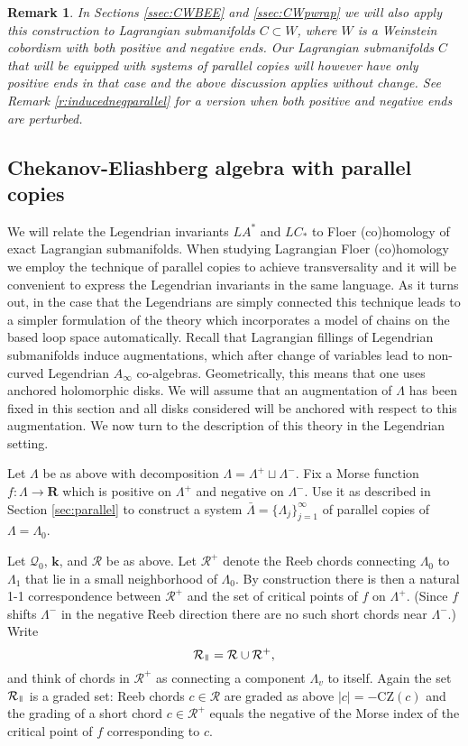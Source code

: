 \documentclass{gtpart}
\newtheorem{rem}[thm]{Remark}
\renewcommand{\k}{\mathbf{k}}
\renewcommand{\R}{\mathbf{R}}
\renewcommand{\parallel}{{\mkern3mu\vphantom{\perp}\vrule depth 0pt\mkern2mu\vrule depth
0pt\mkern3mu}}
\begin{document}
\begin{rem}
	In Sections \ref{ssec:CWBEE} and \ref{ssec:CWpwrap} we will also apply this construction to Lagrangian submanifolds $C\subset W$, where $W$ is a Weinstein cobordism with both positive and negative ends. Our Lagrangian submanifolds $C$ that will be equipped with systems of parallel copies will however have only positive ends in that case and the above discussion applies without change. See Remark \ref{r:inducednegparallel} for a version when both positive and negative ends are perturbed. 
\end{rem}



\subsection{Chekanov-Eliashberg algebra with parallel copies}\label{ssec:parallelcopies}
We will relate the Legendrian invariants $LA^{\ast}$ and $LC_{\ast}$ to Floer (co)homology of exact
Lagrangian submanifolds. When studying Lagrangian Floer (co)homology we employ the technique of
parallel copies to achieve transversality and it will be convenient to express the Legendrian
invariants in the same language. As it turns out, in the case that the Legendrians are simply
connected this technique leads to a simpler formulation of the theory which incorporates a model of
chains on the based loop space automatically. Recall that Lagrangian fillings of Legendrian
submanifolds induce augmentations, which after change of variables lead to non-curved Legendrian
$A_\infty$ co-algebras. Geometrically, this means that one uses anchored holomorphic disks. We will
assume that an augmentation of $\Lambda$ has been fixed in this section and all disks considered
will be anchored with respect to this augmentation. We now turn to the description of this theory in
the Legendrian setting. 
   
Let $\Lambda$ be as above with decomposition $\Lambda=\Lambda^{+}\sqcup\Lambda^{-}$. Fix a Morse
function $f\colon\Lambda\to\R$ which is positive on $\Lambda^{+}$ and negative on $\Lambda^{-}$. Use
it as described in Section \ref{sec:parallel} to construct a system $\bar\Lambda=\{\Lambda_{j}\}_{j=1}^{\infty}$ of parallel copies of $\Lambda=\Lambda_{0}$.    

Let $\mathcal{Q}_{0}$, $\k$, and $\mathcal{R}$ be as above. Let $\mathcal{R}^{+}$ denote the Reeb
chords connecting $\Lambda_{0}$ to $\Lambda_{1}$ that lie in a small neighborhood of $\Lambda_{0}$.
By construction there is then a natural 1-1 correspondence between $\mathcal{R}^{+}$ and the set of
critical points of $f$ on $\Lambda^{+}$. (Since $f$ shifts $\Lambda^{-}$ in the negative Reeb
direction there are no such short chords near $\Lambda^{-}$.) Write
\[ \mathcal{R}_{\parallel}=\mathcal{R}\cup\mathcal{R}^{+}, \]
and think of chords in $\mathcal{R}^{+}$ as connecting a component $\Lambda_{v}$ to itself.
Again the set $\mathcal{R}_{\parallel}$ is a graded set: Reeb chords $c\in \mathcal{R}$ are graded as above $|c|=-\mathrm{CZ}(c)$ and the grading of a short chord $c \in \mathcal{R}^{+}$ equals the negative of the Morse index of the critical point of $f$ corresponding to $c$.
\end{document}
